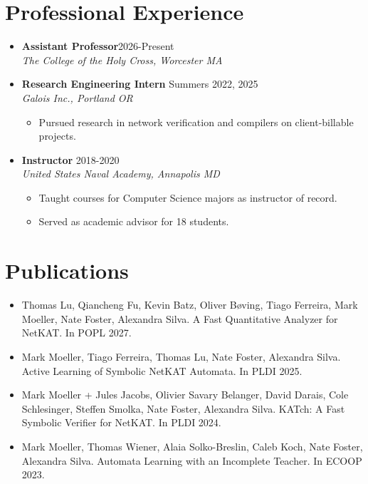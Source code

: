 \documentclass[11pt]{article}
\begin{document}
\section*{Professional Experience}
\begin{itemize}
\item[] \textbf{Assistant Professor}\hfill{2026-Present}\\
\textit{The College of the Holy Cross, Worcester MA}\\

\item[] \textbf{Research Engineering Intern} \hfill{Summers 2022, 2025}\\
\textit{Galois Inc., Portland OR}
\begin{itemize}
    \item Pursued research in network verification and compilers on client-billable projects.
\end{itemize}

\item[] \textbf{Instructor} \hfill{2018-2020}\\
\textit{United States Naval Academy, Annapolis MD}
\begin{itemize}
    \item Taught courses for Computer Science majors as instructor of record.
    \item Served as academic advisor for 18 students.
\end{itemize}
\end{itemize}



\section*{Publications}
\begin{itemize}
\item Thomas Lu, Qiancheng Fu, Kevin Batz, Oliver B{\o}ving, Tiago Ferreira, Mark Moeller, Nate Foster, Alexandra Silva.
A Fast Quantitative Analyzer for NetKAT.
In POPL 2027.
\item Mark Moeller, Tiago Ferreira, Thomas Lu, Nate Foster, Alexandra Silva.
Active Learning of Symbolic NetKAT Automata.
In PLDI 2025.
\item Mark Moeller + Jules Jacobs, Olivier Savary Belanger, David Darais, Cole
Schlesinger, Steffen Smolka, Nate Foster, Alexandra Silva.
KATch: A Fast Symbolic Verifier for NetKAT.
In PLDI 2024.
\item Mark Moeller, Thomas Wiener, Alaia Solko-Breslin, Caleb Koch, Nate Foster, Alexandra Silva.
Automata Learning with an Incomplete Teacher.
In ECOOP 2023.
\end{itemize}
\end{document}
